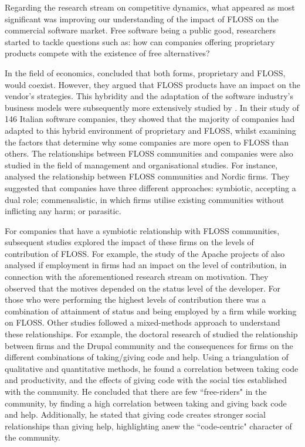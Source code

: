 Regarding the research stream on competitive dynamics, what appeared as most significant was improving our understanding of the impact of FLOSS on the commercial software market. Free software being a public good, researchers started to tackle questions such as: how can companies offering proprietary products compete with the existence of free alternatives?

In the field of economics, \textcite{Bonaccorsi2003} concluded that both forms, proprietary and FLOSS, would coexist. However, they argued that FLOSS products have an impact on the vendor's strategies. This hybridity and the adaptation of the software industry's business models were subsequently more extensively studied by \textcite{bonaccorsi2006entry}. In their study of 146 Italian software companies, they showed that the majority of companies had adapted to this hybrid environment of proprietary and FLOSS, whilst examining the factors that determine why some companies are more open to FLOSS than others. The relationships between FLOSS communities and companies were also studied in the field of management and organisational studies. For instance, \textcite{Dahlander2005} analysed the relationship between FLOSS communities and Nordic firms. They suggested that companies have three different approaches: symbiotic, accepting a dual role; commensalistic, in which firms utilise existing communities without inflicting any harm; or parasitic. 

For companies that have a symbiotic relationship with FLOSS communities, subsequent studies explored the impact of these firms on the levels of contribution of FLOSS. For example, the study of the Apache projects of \textcite{Roberts2006} also analysed if employment in firms had an impact on the level of contribution, in connection with the aforementioned research stream on motivation. They observed that the motives depended on the status level of the developer. For those who were performing the highest levels of contribution there was a combination of attainment of status and being employed by a firm while working on FLOSS. Other studies followed a mixed-methods approach to understand these relationships. For example, the doctoral research of \textcite{Sims2013} studied the relationship between firms and the Drupal community and the consequences for firms on the different combinations of taking\slash giving code and help. Using a triangulation of qualitative and quantitative methods, he found a correlation between taking code and productivity, and the effects of giving code with the social ties established with the community. He concluded that there are few ``free-riders" in the community, by finding a high correlation between taking and giving back code and help. Additionally, he stated that giving code creates stronger social relationships than giving help, highlighting anew the ``code-centric" character of the community. 

